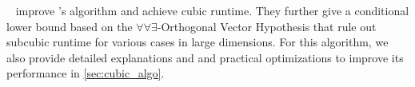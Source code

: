 \citeauthor{polyline_simplification_has_cubic_complexity_bringmannetal}~\cite{polyline_simplification_has_cubic_complexity_bringmannetal} improve \citeauthor{on_optimal_polyline_simplification_using_the_hausdorff_and_frechet_distance}'s algorithm and achieve cubic runtime. They further give a conditional lower bound based on the \(\forall\forall\exists\)-Orthogonal Vector Hypothesis that rule out subcubic runtime for various cases in large dimensions. For this algorithm, we also provide detailed explanations and and practical optimizations to improve its performance in \cref{sec:cubic_algo}.

